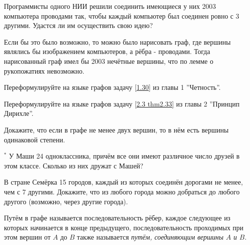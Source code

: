 \begin{thm}
    Программисты одного НИИ решили соединить имеющиеся у них 2003 компьютера проводами так, чтобы каждый компьютер был соединен ровно с 3 другими. Удастся ли им осуществить свою идею?
\end{thm}

\begin{prf}
    Если бы это было возможно, то можно было нарисовать граф, где вершины являлись бы изображением компьютеров, а рёбра - проводами. Тогда нарисованный граф имел бы 2003 нечётные вершины, что по лемме о рукопожатиях невозможно.    
\end{prf}

    \begin{ex}
        Переформулируйте на языке графов задачу \ref{1.30} из главы 1 ''Четность''.
    \end{ex}

\begin{ex}
    Переформулируйте на языке графов задачу \ref{2.3 thm2.33} из главы 2 ''Принцип Дирихле''.
\end{ex}

\begin{thm}
    Докажите, что если в графе не менее двух вершин, то в нём есть вершины одинаковой степени.
\end{thm}

\begin{thm} $^*$
    У Маши 24 одноклассника, причём все они имеют различное число друзей в этом классе. Сколько из них дружат с Машей?
\end{thm}

\begin{thm} \label{7.0 thm3}
    В стране Семёрка 15 городов, каждый из которых соединён дорогами не менее, чем с 7 другими. Докажите, что из любого города можно добраться до любого другого (возможно, через другие города).
\end{thm}

\begin{dfn}
    Путём в графе называется последовательность рёбер, каждое следующее из которых начинается в конце предыдущего, последовательность проходимых при этом вершин от $A$ до $B$ также называется \textit{путём, соединяющим вершины $A$ и $B$}.\footnotemark 
\end{dfn}

